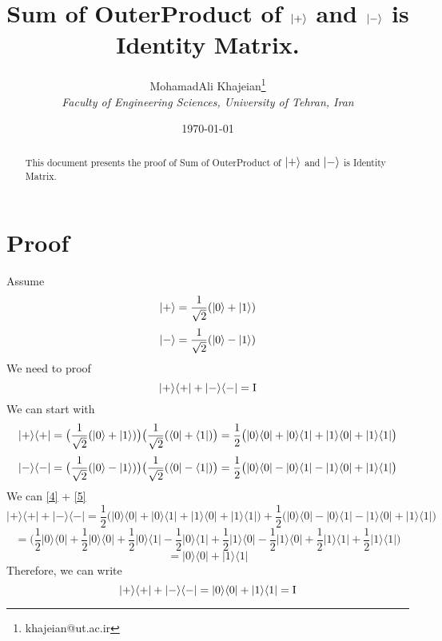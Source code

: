 \documentclass[12pt]{article}
\title{\textbf{Sum of OuterProduct of $\ket{+}$  and $\ket{-}$ is Identity Matrix.}}
\author{
    MohamadAli Khajeian\footnote{khajeian@ut.ac.ir} \\ 
    \small \textit{Faculty of Engineering Sciences, University of Tehran, Iran} \\ 
}
\date{\today}
\begin{document}
\maketitle

\begin{abstract}
    This document presents the proof of Sum of OuterProduct of $\ket{+}$  and $\ket{-}$ is Identity Matrix.
\end{abstract}

\section*{Proof}

Assume
\begin{equation}
    \ket{+} = \frac{1}{\sqrt{2}}(\ket{0}+\ket{1})
\end{equation}
\begin{equation}
    \ket{-} = \frac{1}{\sqrt{2}}(\ket{0}-\ket{1})
\end{equation}
We need to proof
\begin{equation}
    |+\rangle \langle+| + |-\rangle \langle-| = \textnormal{I}
\end{equation}
We can start with
\begin{equation}
    \label{4}
    |+\rangle \langle+| = \big(\frac{1}{\sqrt{2}}(\ket{0}+\ket{1})\big)\big(\frac{1}{\sqrt{2}}(\bra{0}+\bra{1})\big)
    = \frac{1}{2}\big(|0\rangle \langle0| + |0\rangle \langle1| + |1\rangle \langle0| + |1\rangle \langle1|\big)
\end{equation}
\begin{equation}
    \label{5}
    |-\rangle \langle-| = \big(\frac{1}{\sqrt{2}}(\ket{0}-\ket{1})\big)\big(\frac{1}{\sqrt{2}}(\bra{0}-\bra{1})\big)
    = \frac{1}{2}\big(|0\rangle \langle0| - |0\rangle \langle1| - |1\rangle \langle0| + |1\rangle \langle1|\big)
\end{equation}
We can \ref{4} + \ref{5}
\begin{equation*}
    |+\rangle \langle+| + |-\rangle \langle-| = \frac{1}{2}\big(|0\rangle \langle0| + |0\rangle \langle1| + |1\rangle \langle0| + |1\rangle \langle1|\big) +  \frac{1}{2}\big(|0\rangle \langle0| - |0\rangle \langle1| - |1\rangle \langle0| + |1\rangle \langle1|\big)
\end{equation*}
\begin{equation*}
    = \big(\frac{1}{2}|0\rangle \langle0| + \frac{1}{2}|0\rangle \langle0| + \frac{1}{2}|0\rangle \langle1| - \frac{1}{2}|0\rangle \langle1| + \frac{1}{2}|1\rangle \langle0| - \frac{1}{2}|1\rangle \langle0| + \frac{1}{2}|1\rangle \langle1| + \frac{1}{2}|1\rangle \langle1|\big)
\end{equation*}
\begin{equation*}
    = |0\rangle \langle0| + |1\rangle \langle1|
\end{equation*}
Therefore, we can write
\begin{equation}
    |+\rangle \langle+| + |-\rangle \langle-| = |0\rangle \langle0| + |1\rangle \langle1| = \textnormal{I}
\end{equation}
\end{document}

